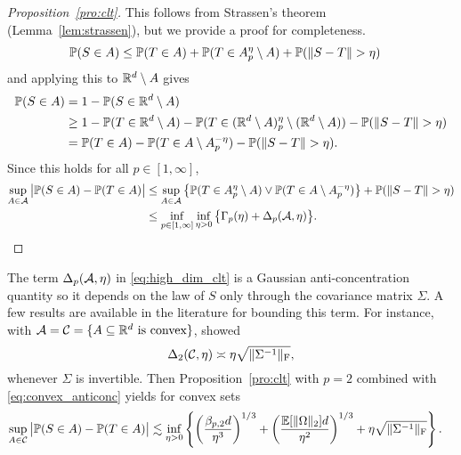 \begin{proof}[Proposition~\ref{pro:clt}]

  This follows from Strassen's theorem (Lemma~\ref{lem:strassen}), but we
  provide a proof for completeness.
  \begin{align*}
    \P(S \in A)
    &\leq
    \P(T \in A)
    + \P(T \in A_p^\eta \setminus A)
    + \P(\|S - T\| > \eta)
  \end{align*}
  and applying this to $\R^d \setminus A$ gives
  \begin{align*}
    \P(S\in A)
    &=
    1 - \P(S\in \R^d \setminus A) \\
    &\geq
    1 - \P(T \in \R^d \setminus A)
    - \P(T \in (\R^d \setminus A)_p^\eta \setminus (\R^d \setminus A))
    - \P(\|S - T\| > \eta) \\
    &=
    \P(T \in A)
    - \P(T \in A \setminus A_p^{-\eta})
    - \P(\|S - T\| > \eta).
  \end{align*}
  Since this holds for all $p \in [1, \infty]$,
  \begin{align*}
    \sup_{A\in \cA}
    \big|\P(S\in A) -\P(T\in A)\big|
    &\leq
    \sup_{A \in \cA}
    \big\{\P(T \in A_p^\eta\setminus A)
    \vee \P(T \in A \setminus A_p^{-\eta})\big\}
    + \P(\|S - T\| > \eta) \\
    &\leq
    \inf_{p \in [1, \infty]} \inf_{\eta>0}
    \big\{\Gamma_p(\eta) + \Delta_p(\cA, \eta) \big\}.
  \end{align*}
\end{proof}

The term $\Delta_p(\cA, \eta)$
in \eqref{eq:high_dim_clt} is a Gaussian anti-concentration quantity
so it depends on the law of $S$ only through the covariance matrix $\Sigma$.
A few results are available in the literature
for bounding this term.
For instance, with
$\cA = \cC = \{A \subseteq \R^d \text{ is convex}\}$,
\citet{nazarov2003maximal} showed
%
\begin{equation}%
  \label{eq:convex_anticonc}
  \Delta_2(\cC, \eta)
  \asymp
  \eta\sqrt{\|\Sigma^{-1}\|_{\rF}},
\end{equation}
%
whenever $\Sigma$ is invertible.
Then Proposition~\ref{pro:clt} with $p=2$
combined with \eqref{eq:convex_anticonc} yields for convex sets
%
\begin{align*}
  \sup_{A\in \cC}
  \big|\P(S\in A) -\P(T\in A)\big|
  &\lesssim
  \inf_{\eta > 0}
  \left\{
    \left(\frac{\beta_{p,2} d}{\eta^3}\right)^{1/3}
    + \left(\frac{\E[\|\Omega \|_2] d}{\eta^2}\right)^{1/3}
    + \eta \sqrt{\|\Sigma^{-1}\|_\rF}
  \right\}.
\end{align*}

